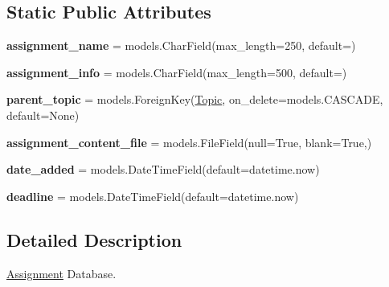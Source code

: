 \subsection*{Static Public Attributes}
\begin{DoxyCompactItemize}
\item 
\mbox{\label{classindex_1_1models_1_1Assignment_aaba1da5934719ffc920a54f0c898e7db}} 
{\bfseries assignment\+\_\+name} = models.\+Char\+Field(max\+\_\+length=250, default=\textquotesingle{}\textquotesingle{})
\item 
\mbox{\label{classindex_1_1models_1_1Assignment_a6cb471e3afa7b0bd23639d0a38671309}} 
{\bfseries assignment\+\_\+info} = models.\+Char\+Field(max\+\_\+length=500, default=\textquotesingle{}\textquotesingle{})
\item 
\mbox{\label{classindex_1_1models_1_1Assignment_a1b63cd97bcf1373facb7ba0cc5aa109f}} 
{\bfseries parent\+\_\+topic} = models.\+Foreign\+Key(\hyperlink{classindex_1_1models_1_1Topic}{Topic}, on\+\_\+delete=models.\+C\+A\+S\+C\+A\+DE, default=None)
\item 
\mbox{\label{classindex_1_1models_1_1Assignment_a339c88ad6424d5aa1da49fe40eb8102c}} 
{\bfseries assignment\+\_\+content\+\_\+file} = models.\+File\+Field(null=True, blank=True,)
\item 
\mbox{\label{classindex_1_1models_1_1Assignment_a2486e6e3f79730503b0fdecc7df1d3b1}} 
{\bfseries date\+\_\+added} = models.\+Date\+Time\+Field(default=datetime.\+now)
\item 
\mbox{\label{classindex_1_1models_1_1Assignment_a637e73eddb2e5d943585f772b280a809}} 
{\bfseries deadline} = models.\+Date\+Time\+Field(default=datetime.\+now)
\end{DoxyCompactItemize}


\subsection{Detailed Description}
\hyperlink{classindex_1_1models_1_1Assignment}{Assignment} Database. 


